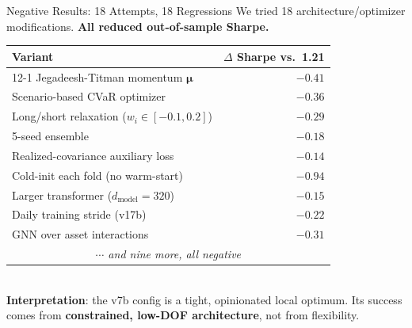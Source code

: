 \documentclass[10pt, aspectratio=169]{beamer}
\newcommand{\bmu}{\boldsymbol{\mu}}
\begin{document}
\begin{frame}{Negative Results: 18 Attempts, 18 Regressions}
We tried 18 architecture/optimizer modifications. \textbf{All reduced out-of-sample Sharpe.}
\vspace{0.3em}
\centering\footnotesize
\begin{tabular}{lr}
\toprule
Variant & $\Delta$ Sharpe vs.\ 1.21 \\
\midrule
12-1 Jegadeesh-Titman momentum $\bmu$            & $-0.41$ \\
Scenario-based CVaR optimizer                     & $-0.36$ \\
Long/short relaxation ($w_i \in [-0.1, 0.2]$)     & $-0.29$ \\
5-seed ensemble                                   & $-0.18$ \\
Realized-covariance auxiliary loss                & $-0.14$ \\
Cold-init each fold (no warm-start)               & $-0.94$ \\
Larger transformer ($d_{\text{model}}=320$)       & $-0.15$ \\
Daily training stride (v17b)                      & $-0.22$ \\
GNN over asset interactions                       & $-0.31$ \\
\multicolumn{2}{c}{\emph{$\cdots$ and nine more, all negative}} \\
\bottomrule
\end{tabular}
\vspace{0.5em}\\
\textbf{Interpretation}: the v7b config is a tight, opinionated local optimum. Its success comes from \textbf{constrained, low-DOF architecture}, not from flexibility.
\end{frame}
\end{document}
